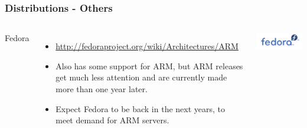 \begin{frame}
  \frametitle{Distributions - Others}
  \begin{columns}[T]
    Fedora
    \begin{itemize}
    \item \url{http://fedoraproject.org/wiki/Architectures/ARM}
    \item Also has some support for ARM, but ARM releases get much less
      attention and are currently made more than one year later.
    \item Expect Fedora to be back in the next years, to meet demand for
      ARM servers.
    \end{itemize}
    \includegraphics[width=\textwidth]{slides/sysdev-embedded-linux/fedora.png}\\
  \end{columns}
\end{frame}

